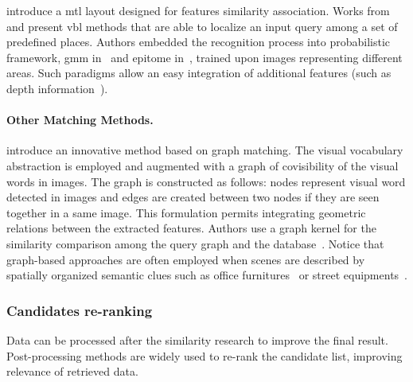 \citet{Lu2015} introduce a \ac{mtl} layout designed for features similarity association. Works from \citet{torralba2003context} and \citet{Ni2009} present \ac{vbl} methods that are able to localize an input query among a set of predefined places. Authors embedded the recognition process into probabilistic framework, \ac{gmm} in~\citep{torralba2003context} and epitome in~\citep{Ni2009}, trained upon images representing different areas. Such paradigms allow an easy integration of additional features (such as depth information~\citep{Ni2009}).

\paragraph{Other Matching Methods.}
\citet{Stumm2015a} introduce an innovative method based on graph matching. The visual vocabulary abstraction is employed and augmented with a graph of covisibility of the visual words in images. The graph is constructed as follows: nodes represent visual word detected in images and edges are created between two nodes if they are seen together in a same image. This formulation permits integrating geometric relations between the extracted features. Authors use a graph kernel for the similarity comparison among the query graph and the database~\citep{Stumm2015,Stumm2016}. Notice that graph-based approaches are often employed when scenes are described by spatially organized semantic clues such as office furnitures~\citep{Salas-Moreno2013} or street equipments~\citep{Ardeshir2014}.

\subsubsection{Candidates re-ranking}
\label{subsec:candidates_re_ranking}
Data can be processed after the similarity research to improve the final result. Post-processing methods are widely used to re-rank the candidate list, improving relevance of retrieved data.


